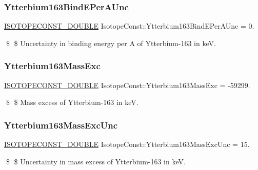 \subsubsection{\texorpdfstring{Ytterbium163\+Bind\+E\+Per\+A\+Unc}{Ytterbium163BindEPerAUnc}}
{\footnotesize\ttfamily \mbox{\hyperlink{group___isotope_const-_macros_ga8f45a7272ce02c0b4c65c44636ed719a}{I\+S\+O\+T\+O\+P\+E\+C\+O\+N\+S\+T\+\_\+\+D\+O\+U\+B\+LE}} Isotope\+Const\+::\+Ytterbium163\+Bind\+E\+Per\+A\+Unc = 0.}

\$ \$ Uncertainty in binding energy per A of Ytterbium-\/163 in keV. \mbox{\label{group___isotope_const-_ytterbium-_yb163_ga3a727e25846b0e8b997393eca89cfadd}} 
\subsubsection{\texorpdfstring{Ytterbium163\+Mass\+Exc}{Ytterbium163MassExc}}
{\footnotesize\ttfamily \mbox{\hyperlink{group___isotope_const-_macros_ga8f45a7272ce02c0b4c65c44636ed719a}{I\+S\+O\+T\+O\+P\+E\+C\+O\+N\+S\+T\+\_\+\+D\+O\+U\+B\+LE}} Isotope\+Const\+::\+Ytterbium163\+Mass\+Exc = -\/59299.}

\$ \$ Mass excess of Ytterbium-\/163 in keV. \mbox{\label{group___isotope_const-_ytterbium-_yb163_gad9cafc695dd8225af4acd4a5686ed901}} 
\subsubsection{\texorpdfstring{Ytterbium163\+Mass\+Exc\+Unc}{Ytterbium163MassExcUnc}}
{\footnotesize\ttfamily \mbox{\hyperlink{group___isotope_const-_macros_ga8f45a7272ce02c0b4c65c44636ed719a}{I\+S\+O\+T\+O\+P\+E\+C\+O\+N\+S\+T\+\_\+\+D\+O\+U\+B\+LE}} Isotope\+Const\+::\+Ytterbium163\+Mass\+Exc\+Unc = 15.}

\$ \$ Uncertainty in mass excess of Ytterbium-\/163 in keV. \mbox{\label{group___isotope_const-_ytterbium-_yb163_ga365351f8e2a0d6e4a2b2e25217458cf7}} 
